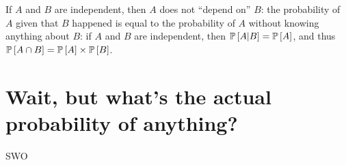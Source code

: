 If $A$ and $B$ are independent, then $A$ does not ``depend on'' $B$: the
probability of $A$ given that $B$ happened is equal to the probability of $A$
without knowing anything about $B$: if $A$ and $B$ are independent, then
$\mathbb{P}\left[{A | B}\right] = \mathbb{P}\left[{A}\right]$, and thus $\mathbb{P}\left[{A \cap B}\right] = \mathbb{P}\left[{A}\right] \times
\mathbb{P}\left[{B}\right]$.

\section{Wait, but what's the actual probability of anything?}

SWO
